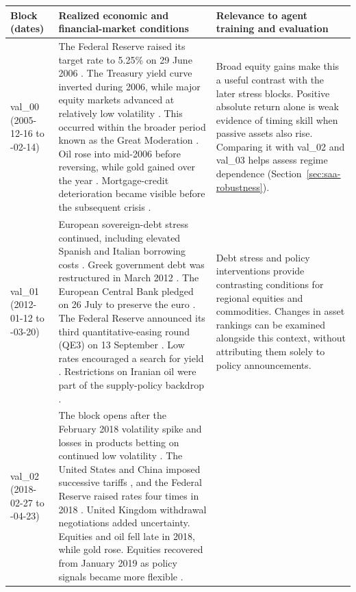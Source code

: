 \begin{table}[p]
\centering
\small
\begin{tabular}{@{}p{2.46cm}p{6.85cm}p{6.85cm}@{}}
\toprule
\textbf{Block (dates)} & \textbf{Realized economic and financial-market conditions} & \textbf{Relevance to agent training and evaluation} \\
\midrule
val\_00 \newline (2005-12-16 to \newline 2007-02-14) &
The Federal Reserve raised its target rate to 5.25\% on 29 June 2006 \cite{FedRateJune2006}. The Treasury yield curve inverted during 2006, while major equity markets advanced at relatively low volatility \cite{FREDTreasurySpread,BISFinancialMarkets2007}. This occurred within the broader period known as the Great Moderation \cite{BernankeGreatModeration2004}. Oil rose into mid-2006 before reversing, while gold gained over the year \cite{WorldBankCommodityPrices}. Mortgage-credit deterioration became visible before the subsequent crisis \cite{FCIC2011}. &
Broad equity gains make this a useful contrast with the later stress blocks. Positive absolute return alone is weak evidence of timing skill when passive assets also rise. Comparing it with val\_02 and val\_03 helps assess regime dependence (Section~\ref{sec:saa-robustness}). \\
\addlinespace
val\_01 \newline (2012-01-12 to \newline 2013-03-20) &
European sovereign-debt stress continued, including elevated Spanish and Italian borrowing costs \cite{BISPolicyMeasures2012}. Greek government debt was restructured in March 2012 \cite{GreekDebtRestructuring2013}. The European Central Bank pledged on 26 July to preserve the euro \cite{DraghiEuroJuly2012}. The Federal Reserve announced its third quantitative-easing round (QE3) on 13 September \cite{FedAssetPurchasesSeptember2012}. Low rates encouraged a search for yield \cite{BISPolicyMeasures2012}. Restrictions on Iranian oil were part of the supply-policy backdrop \cite{EUIranSanctions2012}. &
Debt stress and policy interventions provide contrasting conditions for regional equities and commodities. Changes in asset rankings can be examined alongside this context, without attributing them solely to policy announcements. \\
\addlinespace
val\_02 \newline (2018-02-27 to \newline 2019-04-23) &
The block opens after the February 2018 volatility spike and losses in products betting on continued low volatility \cite{BISVolatility2018}. The United States and China imposed successive tariffs \cite{BownTradeWarTariffs}, and the Federal Reserve raised rates four times in 2018 \cite{FedPolicyDecisions2018}. United Kingdom withdrawal negotiations added uncertainty. Equities and oil fell late in 2018, while gold rose. Equities recovered from January 2019 as policy signals became more flexible \cite{BISRetreatRebound2019,WorldBankCommodityPrices}. &

\end{tabular}
\end{table}
